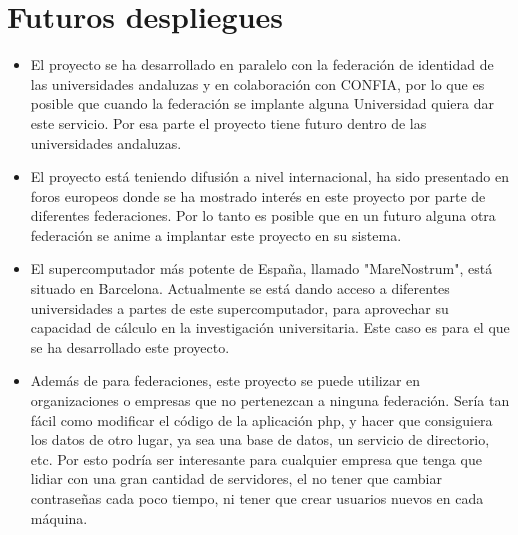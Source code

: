 \section{Futuros despliegues}

    \begin{itemize}

    \item El proyecto se ha desarrollado en paralelo con la federación de
    identidad de las universidades andaluzas y en colaboración con CONFIA,
    por lo que es posible que cuando la federación se implante alguna
    Universidad quiera dar este servicio. Por esa parte el proyecto tiene
    futuro dentro de las universidades andaluzas.

    \item El proyecto está teniendo difusión a nivel internacional, ha
    sido presentado en foros europeos donde se ha mostrado interés en
    este proyecto por parte de diferentes federaciones. Por lo tanto
    es posible que en un futuro alguna otra federación se anime a
    implantar este proyecto en su sistema.

    \item El supercomputador más potente de España, llamado "MareNostrum",
    está situado en Barcelona. Actualmente se está dando acceso a
    diferentes universidades a partes de este supercomputador, para
    aprovechar su capacidad de cálculo en la investigación universitaria.
    Este caso es para el que se ha desarrollado este proyecto.

    \item Además de para federaciones, este proyecto se puede utilizar en
    organizaciones o empresas que no pertenezcan a ninguna federación.
    Sería tan fácil como modificar el código de la aplicación php, y hacer
    que consiguiera los datos de otro lugar, ya sea una base de datos, un
    servicio de directorio, etc. Por esto podría ser interesante para
    cualquier empresa que tenga que lidiar con una gran cantidad de
    servidores, el no tener que cambiar contraseñas cada poco tiempo, ni
    tener que crear usuarios nuevos en cada máquina.

    \end{itemize}
